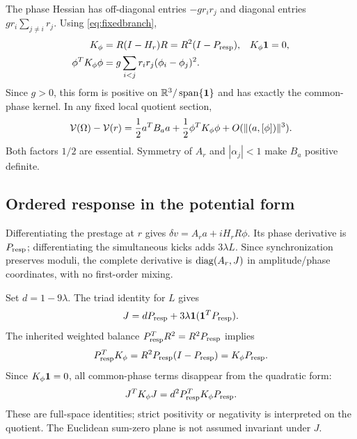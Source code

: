 The phase Hessian has off-diagonal entries \(-gr_ir_j\) and diagonal entries \(gr_i\sum_{j\ne i}r_j\). Using \eqref{eq:fixedbranch},
\begin{align}
K_\phi&=R(I-H_r)R=R^2(I-P_{\rm resp}),&
K_\phi\mathbf1&=0,\notag\\
\phi^TK_\phi\phi&=g\sum_{i<j}r_ir_j(\phi_i-\phi_j)^2.&&
\label{eq:Kphi}
\end{align}
Since \(g>0\), this form is positive on \(\mathbb R^3/\operatorname{span}\{\mathbf1\}\) and has exactly the common-phase kernel. In any fixed local quotient section,
\begin{equation}
\mathcal V(\Omega)-\mathcal V(r)
=\frac12a^TB_aa+\frac12\phi^TK_\phi\phi
+O(\|(a,[\phi])\|^3).
\label{eq:hessianexp}
\end{equation}
Both factors \(1/2\) are essential. Symmetry of \(A_r\) and \(|\alpha_j|<1\) make \(B_a\) positive definite.

\subsection{Ordered response in the potential form}
Differentiating the prestage at \(r\) gives
\(\delta v=A_ra+iH_rR\phi\). Its phase derivative is \(P_{\rm resp}\); differentiating the simultaneous kicks adds \(3\lambda L\). Since synchronization preserves moduli, the complete derivative is \(\operatorname{diag}(A_r,J)\) in amplitude/phase coordinates, with no first-order mixing.

Set \(d=1-9\lambda\). The triad identity for \(L\) gives
\begin{equation}
J=dP_{\rm resp}+3\lambda\mathbf1(\mathbf1^TP_{\rm resp}).
\label{eq:Jdecomp}
\end{equation}
The inherited weighted balance \(P_{\rm resp}^TR^2=R^2P_{\rm resp}\) implies
\begin{equation}
P_{\rm resp}^TK_\phi
=R^2P_{\rm resp}(I-P_{\rm resp})=K_\phi P_{\rm resp}.
\label{eq:PK}
\end{equation}
Since \(K_\phi\mathbf1=0\), all common-phase terms disappear from the quadratic form:
\begin{equation}
J^TK_\phi J=d^2P_{\rm resp}^TK_\phi P_{\rm resp}.
\label{eq:JKJ}
\end{equation}
These are full-space identities; strict positivity or negativity is interpreted on the quotient. The Euclidean sum-zero plane is not assumed invariant under \(J\).

